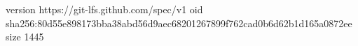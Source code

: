 version https://git-lfs.github.com/spec/v1
oid sha256:80d55e898173bba38abd56d9aec68201267899f762cad0b6d62b1d165a0872ee
size 1445
